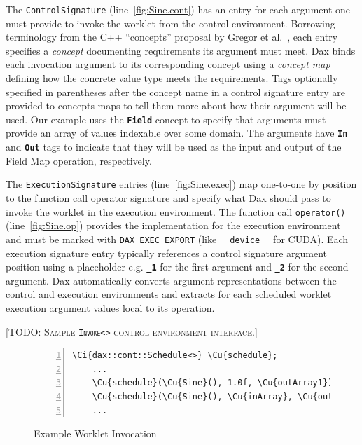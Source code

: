 \documentclass[conference]{IEEEtran}
\newcommand*{\scite}[1]{~\cite{#1}}
\newcommand{\etal}{et al.}
\newcommand{\Ci}[1]{{\textbf{#1}}} %
\newcommand{\Cu}[1]{{\color{gray}\textbf{#1}}} %
\newcommand{\Code}[1]{{\small\texttt{#1}}}
\newcommand{\fix}[1]{{\color{red}\textsc{[#1]}}}
\begin{document}
The \Code{ControlSignature} (line~\ref{fig:Sine.cont}) has an entry
for each argument one must provide to invoke the worklet from the
control environment.
%
Borrowing terminology from the C++ ``concepts'' proposal by Gregor
\etal\scite{Gregor2006}, each entry specifies a \emph{concept}
documenting requirements its argument must meet.
%
Dax binds each invocation argument to its corresponding concept using
a \emph{concept map} defining how the concrete value type meets the
requirements.
%
Tags optionally specified in parentheses after the concept name in a
control signature entry are provided to concepts maps to tell them
more about how their argument will be used.
%
Our example uses the \Code{\Ci{Field}} concept to specify that
arguments must provide an array of values indexable over some domain.
%
The arguments have \Code{\Ci{In}} and \Code{\Ci{Out}} tags to indicate
that they will be used as the input and output of the Field Map
operation, respectively.

The \Code{ExecutionSignature} entries (line~\ref{fig:Sine.exec}) map
one-to-one by position to the function call operator signature and
specify what Dax should pass to invoke the worklet in the execution
environment.
%
The function call \Code{operator()} (line~\ref{fig:Sine.op}) provides
the implementation for the execution environment and must be marked
with \Code{DAX\_EXEC\_EXPORT} (like \Code{\_\_device\_\_} for CUDA).
%
Each execution signature entry typically references a control
signature argument position using a placeholder e.g. \Code{\Ci{\_1}}
for the first argument and \Code{\Ci{\_2}} for the second argument.
%
Dax automatically converts argument representations between the
control and execution environments and extracts for each scheduled
worklet execution argument values local to its operation.

\fix{TODO: Sample \Code{Invoke<>} control environment interface.}

\begin{figure}[ht]\centering
  \begin{Verbatim}[commandchars=\\\{\}, gobble=4, frame=single,
                   fontfamily=tt, fontsize=\scriptsize,
                   numbers=left, numbersep=2pt]
    \Ci{dax::cont::Schedule<>} \Cu{schedule};
    ...
    \Cu{schedule}(\Cu{Sine}(), 1.0f, \Cu{outArray1});
    \Cu{schedule}(\Cu{Sine}(), \Cu{inArray}, \Cu{outArray2});
    ...
  \end{Verbatim}
  \caption{Example Worklet Invocation}\label{fig:InvokeSine}
\end{figure}
\end{document}
